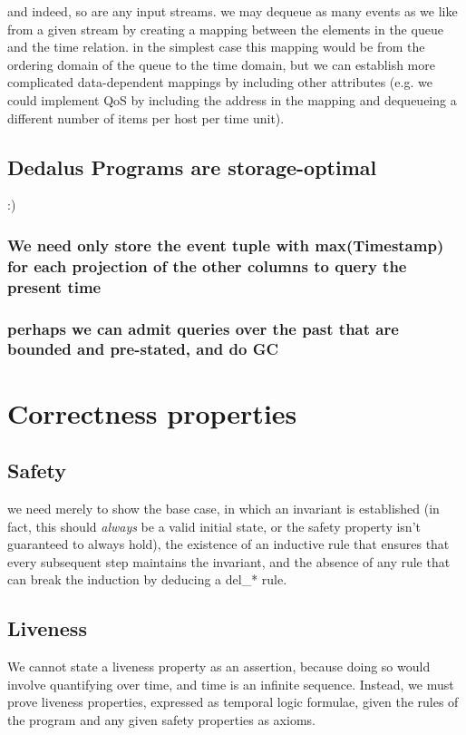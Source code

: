 \documentclass{acm_proc_article-sp-sigmod09}
\begin{document}
and indeed, so are any input streams.  we may dequeue as many events as we like from a given stream by creating a mapping
between the elements in the queue and the time relation.  in the simplest case this mapping would be from the ordering domain 
of the queue to the time domain, but we can establish more complicated data-dependent mappings by including other attributes 
(e.g. we could implement QoS by including the address in the mapping and dequeueing a different number of items per host
per time unit).

\subsection{Dedalus Programs are storage-optimal}

:)

\subsubsection{We need only store the event tuple with max(Timestamp) for each projection of the other columns to query the present time}


\subsubsection{perhaps we can admit queries over the past that are bounded and pre-stated, and do GC}

\section{Correctness properties}

\subsection{Safety}

we need merely to show the base case, in which an invariant is established (in fact, this should \emph{always} be a valid 
initial state, or the safety property isn't guaranteed to always hold), the existence of an inductive rule that ensures that every 
subsequent step maintains the invariant, and the absence of any rule that can break the induction by deducing a del\_* rule.

\subsection{Liveness}

We cannot state a liveness property as an assertion, because doing so would involve quantifying over time,
and time is an infinite sequence.  Instead, we must prove liveness properties, expressed as temporal logic
formulae, given the rules of the program and any given safety properties as axioms.
\end{document}
